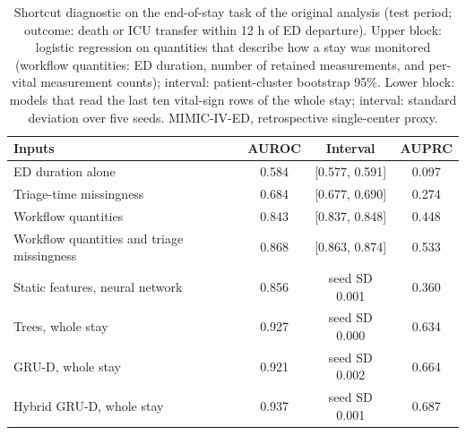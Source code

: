 \begin{table}[t]
\centering
\caption{Shortcut diagnostic on the end-of-stay task of the original analysis (test period; outcome: death or ICU transfer within 12 h of ED departure). Upper block: logistic regression on quantities that describe how a stay was monitored (workflow quantities: ED duration, number of retained measurements, and per-vital measurement counts); interval: patient-cluster bootstrap 95\%. Lower block: models that read the last ten vital-sign rows of the whole stay; interval: standard deviation over five seeds. MIMIC-IV-ED, retrospective single-center proxy.}
\label{tab:shortcuts}
\begin{tabular}{lccc}
\toprule
Inputs & AUROC & Interval & AUPRC \\
\midrule
ED duration alone & 0.584 & [0.577, 0.591] & 0.097 \\
Triage-time missingness & 0.684 & [0.677, 0.690] & 0.274 \\
Workflow quantities & 0.843 & [0.837, 0.848] & 0.448 \\
Workflow quantities and triage missingness & 0.868 & [0.863, 0.874] & 0.533 \\
\midrule
Static features, neural network & 0.856 & seed SD 0.001 & 0.360 \\
Trees, whole stay & 0.927 & seed SD 0.000 & 0.634 \\
GRU-D, whole stay & 0.921 & seed SD 0.002 & 0.664 \\
Hybrid GRU-D, whole stay & 0.937 & seed SD 0.001 & 0.687 \\
\bottomrule
\end{tabular}
\end{table}
